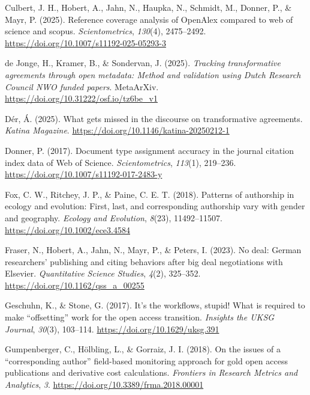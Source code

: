 \documentclass[a4paper,man,floatsintext,longtable,noextraspace,10pt]{apa6}
\newlength{\cslhangindent}
\newenvironment{CSLReferences}[2] %
{\begin{list}{}{%
  \setlength{\itemindent}{0pt}
  \setlength{\leftmargin}{0pt}
  \setlength{\parsep}{0pt}
  \ifodd #1
  \setlength{\leftmargin}{\cslhangindent}
  \setlength{\itemindent}{-1\cslhangindent}
  \fi
  \setlength{\itemsep}{#2\baselineskip}}}
{\end{list}}
\begin{document}
\begin{CSLReferences}{1}{0}
Culbert, J. H., Hobert, A., Jahn, N., Haupka, N., Schmidt, M., Donner,
P., \& Mayr, P. (2025). Reference coverage analysis of OpenAlex compared
to web of science and scopus. \emph{Scientometrics}, \emph{130}(4),
2475--2492. \url{https://doi.org/10.1007/s11192-025-05293-3}

de Jonge, H., Kramer, B., \& Sondervan, J. (2025). \emph{Tracking
transformative agreements through open metadata: Method and validation
using {Dutch Research Council NWO} funded papers}. MetaArXiv.
\url{https://doi.org/10.31222/osf.io/tz6be_v1}

Dér, Á. (2025). What gets missed in the discourse on transformative
agreements. \emph{Katina Magazine}.
\url{https://doi.org/10.1146/katina-20250212-1}

Donner, P. (2017). Document type assignment accuracy in the journal
citation index data of {Web of Science}. \emph{Scientometrics},
\emph{113}(1), 219--236. \url{https://doi.org/10.1007/s11192-017-2483-y}

Fox, C. W., Ritchey, J. P., \& Paine, C. E. T. (2018). Patterns of
authorship in ecology and evolution: First, last, and corresponding
authorship vary with gender and geography. \emph{Ecology and Evolution},
\emph{8}(23), 11492--11507. \url{https://doi.org/10.1002/ece3.4584}

Fraser, N., Hobert, A., Jahn, N., Mayr, P., \& Peters, I. (2023). No
deal: German researchers' publishing and citing behaviors after big deal
negotiations with {Elsevier}. \emph{Quantitative Science Studies},
\emph{4}(2), 325--352. \url{https://doi.org/10.1162/qss_a_00255}

Geschuhn, K., \& Stone, G. (2017). It's the workflows, stupid! What is
required to make {``offsetting''} work for the open access transition.
\emph{Insights the {UKSG} Journal}, \emph{30}(3), 103--114.
\url{https://doi.org/10.1629/uksg.391}

Gumpenberger, C., Hölbling, L., \& Gorraiz, J. I. (2018). On the issues
of a {``corresponding author''} field-based monitoring approach for gold
open access publications and derivative cost calculations.
\emph{Frontiers in Research Metrics and Analytics}, \emph{3}.
\url{https://doi.org/10.3389/frma.2018.00001}


\end{CSLReferences}
\end{document}
